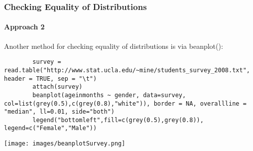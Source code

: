 \begin{frame}
\frametitle{Checking Equality of Distributions}
\framesubtitle{Approach 2}

Another method for checking equality of distributions is via \ttfamily beanplot(): \normalfont

	\begin{lstlisting}
		survey = read.table("http://www.stat.ucla.edu/~mine/students_survey_2008.txt", header = TRUE, sep = "\t")
		attach(survey)
		beanplot(ageinmonths ~ gender, data=survey, col=list(grey(0.5),c(grey(0.8),"white")), border = NA, overallline = "median", ll=0.01, side="both")
		legend("bottomleft",fill=c(grey(0.5),grey(0.8)), legend=c("Female","Male"))
	\end{lstlisting}
	
        \begin{center}
	         \texttt{[image: images/beanplotSurvey.png]}
        \end{center}
\end{frame}



